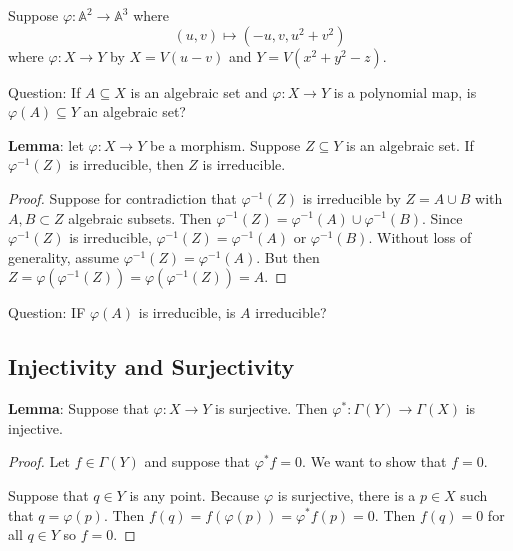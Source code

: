 \documentclass{report}
\begin{document}
\begin{examples}
    \begin{example}
        Suppose $\varphi : \mathbb{A}^{2} \rightarrow \mathbb{A}^{3}$ where
            \begin{equation*}
                (u, v) \mapsto (-u, v, u^{2} + v^{2})
            \end{equation*}
        where $\varphi : X \rightarrow Y$ by $X = V(u - v)$ and $Y = V(x^{2} + y^{2} - z)$.
    \end{example}
\end{examples}

Question: If $A \subseteq X$ is an algebraic set and $\varphi : X \rightarrow Y$ is a polynomial map, is $\varphi(A) \subseteq Y$ an algebraic set?

\textbf{Lemma}: let $\varphi : X \rightarrow Y$ be a morphism. Suppose $Z \subseteq Y$ is an algebraic set. If $\varphi^{-1}(Z)$ is irreducible, then $Z$ is irreducible.
    \begin{proof}
        Suppose for contradiction that $\varphi^{-1}(Z)$ is irreducible by $Z = A \cup B$ with $A, B \subset Z$ algebraic subsets. Then $\varphi^{-1}(Z) = \varphi^{-1}(A) \cup \varphi^{-1}(B)$. Since $\varphi^{-1}(Z)$ is irreducible, $\varphi^{-1}(Z) = \varphi^{-1}(A)$ or $\varphi^{-1}(B)$. Without loss of generality, assume $\varphi^{-1}(Z) = \varphi^{-1}(A)$. But then $Z = \varphi(\varphi^{-1}(Z)) = \varphi(\varphi^{-1}(Z)) = A$. 
    \end{proof}

Question: IF $\varphi(A)$ is irreducible, is $A$ irreducible?

\begin{topic}
    \section{Injectivity and Surjectivity}
\end{topic}

\textbf{Lemma}: Suppose that $\varphi : X \rightarrow Y$ is surjective. Then $\varphi^{*} : \Gamma(Y) \rightarrow \Gamma(X)$ is injective.
    \begin{proof}
        Let $f \in \Gamma(Y)$ and suppose that $\varphi^{*}f = 0$. We want to show that $f = 0$. 
            \begin{center}
            \end{center}
        Suppose that $q \in Y$ is any point. Because $\varphi$ is surjective, there is a $p \in X$ such that $q = \varphi(p)$. Then $f(q) = f(\varphi(p)) = \varphi^{*}f(p) = 0$. Then $f(q) = 0$ for all $q \in Y$ so $f = 0$.
    \end{proof}
\end{document}
